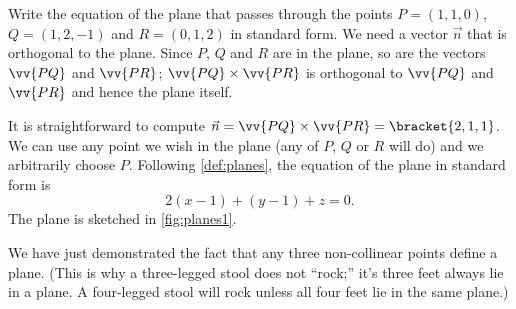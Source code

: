 \begin{example}\label{ex_planes1}
Write the equation of the plane that passes through the points $P=(1,1,0)$, $Q = (1,2,-1)$ and $R = (0,1,2)$ in standard form.
\solution
We need a vector $\vec n$ that is orthogonal to the plane. Since $P$, $Q$ and $R$ are in the plane, so are the vectors $\vv{PQ}$ and $\vv{PR}$; $\vv{PQ}\times\vv{PR}$ is orthogonal to $\vv{PQ}$ and $\vv{PR}$ and hence the plane itself.

It is straightforward to compute $\vec n = \vv{PQ}\times\vv{PR} =\bracket{2,1,1}$. We can use any point we wish in the plane (any of $P$, $Q$ or $R$ will do) and we arbitrarily choose $P$. Following \autoref{def:planes}, the equation of the plane in standard form is 
\[2(x-1) + (y-1)+z = 0.\]
The plane is sketched in \autoref{fig:planes1}.
\end{example}

We have just demonstrated the fact that any three non-collinear points define a plane. (This is why a three-legged stool does not ``rock;'' it's three feet always lie in a plane. A four-legged stool will rock unless all four feet lie in the same plane.)

